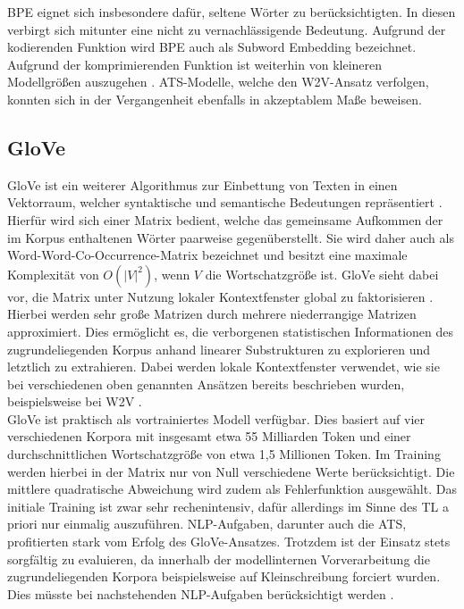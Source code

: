 \noindent
\ac{BPE} eignet sich insbesondere dafür, seltene Wörter zu berücksichtigten. In diesen verbirgt sich mitunter eine nicht zu vernachlässigende Bedeutung. Aufgrund der kodierenden Funktion wird \ac{BPE} auch als Subword Embedding bezeichnet. Aufgrund der komprimierenden Funktion ist weiterhin von kleineren Modellgrößen auszugehen \cite[S.~24]{NIT19}. \ac{ATS}-Modelle, welche den \ac{W2V}-Ansatz verfolgen, konnten sich in der Vergangenheit ebenfalls in akzeptablem Maße beweisen.


\subsection{GloVe}
\noindent
\ac{GloVe} ist ein weiterer Algorithmus zur Einbettung von Texten in einen Vektorraum, welcher syntaktische und semantische Bedeutungen repräsentiert \cite[S.~1]{PEN14}.\\

\noindent
Hierfür wird sich einer Matrix bedient, welche das gemeinsame Aufkommen der im Korpus enthaltenen Wörter paarweise gegenüberstellt. Sie wird daher auch als Word-Word-Co-Occurrence-Matrix bezeichnet und besitzt eine maximale Komplexität von $O(|V|^2)$, wenn $V$ die Wortschatzgröße ist. \ac{GloVe} sieht dabei vor, die Matrix unter Nutzung lokaler Kontextfenster global zu faktorisieren \cite[S.~2]{PEN14}.\\

\noindent
Hierbei werden sehr große Matrizen durch mehrere niederrangige Matrizen approximiert. Dies ermöglicht es, die verborgenen statistischen Informationen des zugrundeliegenden Korpus anhand linearer Substrukturen zu explorieren und letztlich zu extrahieren. Dabei werden lokale Kontextfenster verwendet, wie sie bei verschiedenen oben genannten Ansätzen bereits beschrieben wurden, beispielsweise bei \ac{W2V} \cite[S.~24]{NIT19}.\\

\noindent
\ac{GloVe} ist praktisch als vortrainiertes Modell verfügbar. Dies basiert auf vier verschiedenen Korpora mit insgesamt etwa 55 Milliarden Token und einer durchschnittlichen Wortschatzgröße von etwa 1,5 Millionen Token. Im Training werden hierbei in der Matrix nur von Null verschiedene Werte berücksichtigt. Die mittlere quadratische Abweichung wird zudem als Fehlerfunktion ausgewählt. Das initiale Training ist zwar sehr rechenintensiv, dafür allerdings im Sinne des \ac{TL} a priori nur einmalig auszuführen. \ac{NLP}-Aufgaben, darunter auch die \ac{ATS}, profitierten stark vom Erfolg des \ac{GloVe}-Ansatzes. Trotzdem ist der Einsatz stets sorgfältig zu evaluieren, da innerhalb der modellinternen Vorverarbeitung die zugrundeliegenden Korpora beispielsweise auf Kleinschreibung forciert wurden. Dies müsste bei nachstehenden \ac{NLP}-Aufgaben berücksichtigt werden \cite[S.~6-9]{PEN14}.


